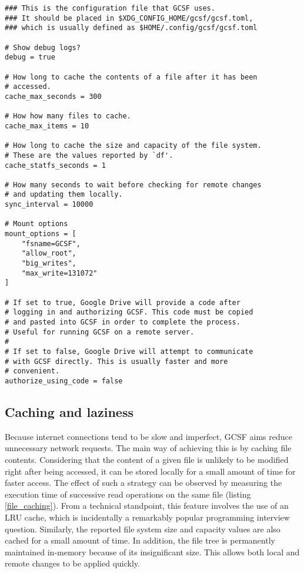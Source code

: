 \begin{lstlisting}[basicstyle=\footnotesize\ttfamily,caption=GCSF configuration file, frame=single, label=gcsf_config,float]
### This is the configuration file that GCSF uses.
### It should be placed in $XDG_CONFIG_HOME/gcsf/gcsf.toml,
### which is usually defined as $HOME/.config/gcsf/gcsf.toml

# Show debug logs?
debug = true

# How long to cache the contents of a file after it has been
# accessed.
cache_max_seconds = 300

# How how many files to cache.
cache_max_items = 10

# How long to cache the size and capacity of the file system.
# These are the values reported by `df'.
cache_statfs_seconds = 1

# How many seconds to wait before checking for remote changes
# and updating them locally.
sync_interval = 10000

# Mount options
mount_options = [
    "fsname=GCSF",
    "allow_root",
    "big_writes",
    "max_write=131072"
]

# If set to true, Google Drive will provide a code after
# logging in and authorizing GCSF. This code must be copied
# and pasted into GCSF in order to complete the process.
# Useful for running GCSF on a remote server.
#
# If set to false, Google Drive will attempt to communicate
# with GCSF directly. This is usually faster and more
# convenient.
authorize_using_code = false
\end{lstlisting}


\subsection{Caching and laziness}

Because internet connections tend to be slow and imperfect, GCSF aims reduce unnecessary network requests. The main way of achieving this is by caching file contents. Considering that the content of a given file is unlikely to be modified right after being accessed, it can be stored locally for a small amount of time for faster access. The effect of such a strategy can be observed by measuring the execution time of successive read operations on the same file (listing \ref{file_caching}). From a technical standpoint, this feature involves the use of an LRU cache, which is incidentally a remarkably popular programming interview question. Similarly, the reported file system size and capacity values are also cached for a small amount of time. In addition, the file tree is permanently maintained in-memory because of its insignificant size. This allows both local and remote changes to be applied quickly.

